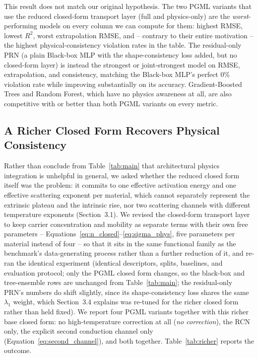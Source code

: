 \documentclass[11pt]{article}
\begin{document}
This result does not match our original hypothesis. The two PGML variants that use the reduced closed-form transport layer (full and physics-only) are the \emph{worst}-performing models on every column we can compute for them: highest RMSE, lowest $R^2$, worst extrapolation RMSE, and -- contrary to their entire motivation -- the highest physical-consistency violation rates in the table. The residual-only PRN (a plain Black-box MLP with the shape-consistency loss added, but no closed-form layer) is instead the strongest or joint-strongest model on RMSE, extrapolation, and consistency, matching the Black-box MLP's perfect 0\% violation rate while improving substantially on its accuracy. Gradient-Boosted Trees and Random Forest, which have no physics awareness at all, are also competitive with or better than both PGML variants on every metric.

\subsection{A Richer Closed Form Recovers Physical Consistency}

Rather than conclude from Table~\ref{tab:main} that architectural physics integration is unhelpful in general, we asked whether the reduced closed form itself was the problem: it commits to one effective activation energy and one effective scattering exponent per material, which cannot separately represent the extrinsic plateau and the intrinsic rise, nor two scattering channels with different temperature exponents (Section~3.1). We revised the closed-form transport layer to keep carrier concentration and mobility as separate terms with their own free parameters -- Equations~\ref{eq:n_closed}--\ref{eq:sigma_phys}, five parameters per material instead of four -- so that it sits in the same functional family as the benchmark's data-generating process rather than a further reduction of it, and re-ran the identical experiment (identical descriptors, splits, baselines, and evaluation protocol; only the PGML closed form changes, so the black-box and tree-ensemble rows are unchanged from Table~\ref{tab:main}; the residual-only PRN's numbers do shift slightly, since its shape-consistency loss shares the same $\lambda_1$ weight, which Section~3.4 explains was re-tuned for the richer closed form rather than held fixed). We report four PGML variants together with this richer base closed form: no high-temperature correction at all (\emph{no correction}), the RCN only, the explicit second conduction channel only (Equation~\ref{eq:second_channel}), and both together. Table~\ref{tab:richer} reports the outcome.
\end{document}
